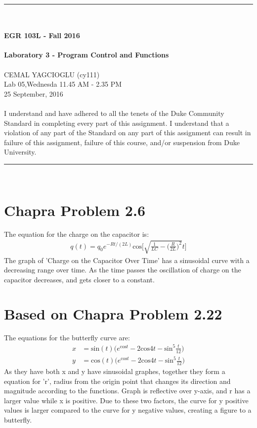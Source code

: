 \documentclass{article}
\begin{document}
\begin{center}
\rule{6.5in}{0.5mm}\\~\\
{\bf \large EGR 103L - Fall 2016}\\~\\
{\huge \bf Laboratory 3 - Program Control and Functions}\\~\\
CEMAL YAGCIOGLU (cy111)\\
Lab 05,Wednesda 11.45 AM - 2.35 PM \\
25 September, 2016\\~\\
{\small I understand and have adhered to all the tenets of the Duke
  Community Standard in completing every part of this assignment.  I
  understand that a violation of any part of the Standard on any part
  of this assignment can result in failure of this assignment, failure
  of this course, and/or suspension from Duke University.} 
\rule{6.5in}{0.5mm}\\
\end{center}
\tableofcontents
\listoffigures
\pagebreak

\section{Chapra Problem 2.6}
The equation for the charge on the capacitor\cite[p.~44]{Chapra} is:
\begin{align*}
q(t)=q_0 e^{-Rt/(2L)}\mathrm{cos}\Bigg[\sqrt{\frac{1}{LC}-\Big(\frac{R}{2L}\Big)^2}t\Bigg]
\end{align*}
The graph of 'Charge on the Capacitor Over Time' has a sinusoidal curve with a decreasing range over time. As the time passes the oscillation of charge on the capacitor decreases, and gets closer to a constant.

\section{Based on Chapra Problem 2.22}
The equations for the butterfly curve\cite[p.~47]{Chapra} are:
\begin{align*}
x &= \mathrm{sin}(t)\bigg(e^{\mathrm{cos}t}-2\mathrm{cos}4t-\mathrm{sin}^5\frac{t}{12}\bigg)\\
y &= \mathrm{cos}(t)\bigg(e^{\mathrm{cos}t}-2\mathrm{cos}4t-\mathrm{sin}^5\frac{t}{12}\bigg)
\end{align*}
As they have both x and y  have sinusoidal graphes, together they form a equation for 'r', radius from the origin point that changes its direction and magnitude according to the functions. Graph is reflective over y-axis, and r has a larger value while x is positive. Due to these two factors, the curve for y positive values is larger compared to the curve for y negative values, creating a figure to a butterfly.  
\end{document}
